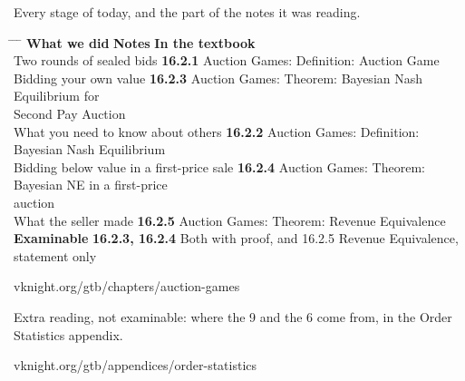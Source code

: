 \vspace{0.3cm}

{\large Every stage of today, and the part of the notes it was reading.}

\vspace{0.35cm}

\hspace{0.3cm}
\begin{minipage}{0.95\linewidth}
\begin{tabbing}
\hspace{6.9cm} \= \hspace{3.0cm} \= \hspace{9.4cm} \= \kill
\textbf{What we did} \> {\color{inkteal}\textbf{Notes}} \> \textbf{In the textbook} \>
  \\[0.5em]
Two rounds of sealed bids \> {\color{inkteal}\textbf{16.2.1}} \> Auction Games:
  Definition: Auction Game \> \\[0.45em]
Bidding your own value \> {\color{inkteal}\textbf{16.2.3}} \> Auction Games: Theorem:
  Bayesian Nash Equilibrium for \> \\
\> \> Second Pay Auction \> \\[0.45em]
What you need to know about others \> {\color{inkteal}\textbf{16.2.2}} \> Auction
  Games: Definition: Bayesian Nash Equilibrium \> \\[0.45em]
Bidding below value in a first-price sale \> {\color{inkteal}\textbf{16.2.4}} \>
  Auction Games: Theorem: Bayesian NE in a first-price \> \\
\> \> auction \> \\[0.45em]
What the seller made \> {\color{inkteal}\textbf{16.2.5}} \> Auction Games:
  Theorem: Revenue Equivalence \> \\[0.45em]
\textbf{Examinable} \> {\color{inkteal}\textbf{16.2.3, 16.2.4}} \> Both with proof,
  and 16.2.5 Revenue Equivalence, \> \\
\> \> statement only \> 
\end{tabbing}
\end{minipage}

\vspace{0.45cm}

{\color{inkgrey} vknight.org/gtb/chapters/auction-games}

\vspace{0.4cm}

{\large Extra reading, not examinable: where the 9 and the 6 come from, in the
Order Statistics appendix.}

{\color{inkgrey} vknight.org/gtb/appendices/order-statistics}


